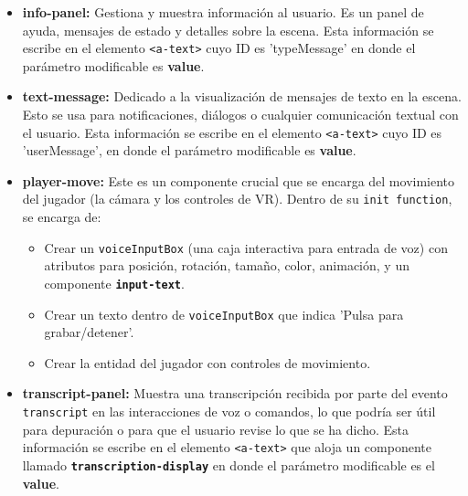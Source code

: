 \documentclass[a4paper, 12pt]{book}
\begin{document}
\begin{itemize}
  \item \textbf{info-panel:}
Gestiona y muestra información al usuario.
Es un panel de ayuda, mensajes de estado y detalles sobre la escena.
Esta información se escribe en el elemento \texttt{<a-text>} cuyo ID es 'typeMessage' en donde el parámetro modificable es \textbf{value}.
  \item \textbf{text-message:}
Dedicado a la visualización de mensajes de texto en la escena.
Esto se usa para notificaciones, diálogos o cualquier comunicación textual con el usuario.
Esta información se escribe en el elemento \texttt{<a-text>} cuyo ID es 'userMessage', en donde el parámetro modificable es \textbf{value}.
  \item \textbf{player-move:}
Este es un componente crucial que se encarga del movimiento del jugador (la cámara y los controles de VR). Dentro de su \texttt{init function}, se encarga de:
\begin{itemize}
  \item Crear un \texttt{voiceInputBox} (una caja interactiva para entrada de voz) con atributos para posición, rotación, tamaño, color, animación, y un componente \texttt{\textbf{input-text}}.
  \item Crear un texto dentro de \texttt{voiceInputBox} que indica 'Pulsa para grabar/detener'.
  \item Crear la entidad del jugador con controles de movimiento.
\end{itemize}
  \item \textbf{transcript-panel:}
Muestra una transcripción recibida por parte del evento \texttt{transcript} en las interacciones de voz o comandos, lo que podría ser útil para depuración o para que el usuario revise lo que se ha dicho.
Esta información se escribe en el elemento \texttt{<a-text>}  que aloja un componente llamado \texttt{\textbf{transcription-display}} en donde el parámetro modificable es el \textbf{value}.
\end{itemize}
\end{document}

